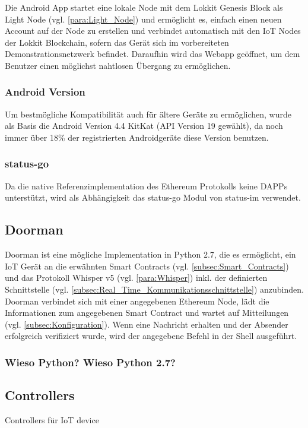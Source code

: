 Die Android App startet eine lokale Node mit dem Lokkit Genesis Block als Light Node (vgl. \ref{para:Light_Node}) und ermöglicht es, einfach einen neuen Account auf der Node zu erstellen und verbindet automatisch mit den IoT Nodes der Lokkit Blockchain, sofern das Gerät sich im vorbereiteten Demonstrationsnetzwerk befindet. Daraufhin wird das Webapp geöffnet, um dem Benutzer einen möglichst nahtlosen Übergang zu ermöglichen.
\subsubsection{Android Version}
Um bestmögliche Kompatibilität auch für ältere Geräte zu ermöglichen, wurde als Basis die Android Version 4.4 KitKat (API Version 19 gewählt), da noch immer über 18\% der registrierten Androidgeräte diese Version benutzen.\cite[Android/Dashboards]{developer.android.com}
\subsubsection{status-go}
Da die native Referenzimplementation des Ethereum Protokolls keine \acrshort{DAPPs} unterstützt, wird als Abhängigkeit das status-go Modul von status-im verwendet.\cite{go-ethereum,status.im,github.com/status-im/status-go}


\subsection{Doorman}
\label{subsec:Doorman}
Doorman ist eine mögliche Implementation in Python 2.7, die es ermöglicht, ein IoT Gerät an die erwähnten Smart Contracts (vgl. \ref{subsec:Smart_Contracts}) und das Protokoll Whisper v5 (vgl. \ref{para:Whisper}) inkl. der definierten Schnittstelle (vgl. \ref{subsec:Real_Time_Kommunikationsschnittstelle}) anzubinden. Doorman verbindet sich mit einer angegebenen Ethereum Node, lädt die Informationen zum angegebenen Smart Contract und wartet auf Mitteilungen (vgl. \ref{subsec:Konfiguration}). Wenn eine Nachricht erhalten und der Absender erfolgreich verifiziert wurde, wird der angegebene Befehl in der Shell ausgeführt.

\subsubsection{Wieso Python? Wieso Python 2.7?}

\subsection{Controllers}
Controllers für IoT device
